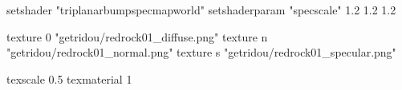 setshader "triplanarbumpspecmapworld"
setshaderparam "specscale" 1.2 1.2 1.2

   texture 0 "getridou/redrock01_diffuse.png"
   texture n "getridou/redrock01_normal.png"
   texture s "getridou/redrock01_specular.png"

texscale 0.5
texmaterial 1
